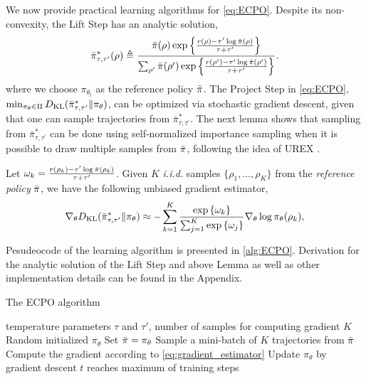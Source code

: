 We now provide practical learning algorithms for \cref{eq:ECPO}.
Despite its non-convexity, the Lift Step
has an analytic solution,
{\small
\begin{equation}
	\label{eq:pitautauprime}
	\bar{\pi}_{\tau,\tau^{\prime}}^*(\rho) \triangleq \frac{\bar{\pi}(\rho) \exp\left\{ \frac{r(\rho)-\tau^{\prime} \log \bar{\pi}(\rho) }{ \tau+\tau^{\prime}} \right\}}{ \sum_{\rho^{\prime}}{\bar{\pi}(\rho^{\prime}) \exp\left\{ \frac{r(\rho^{\prime})-\tau^{\prime} \log \bar{\pi}(\rho^{\prime})}{ \tau+\tau^{\prime}} \right\} } }.
\end{equation}
}	
 where we choose $\pi_{\theta_t}$ as the reference policy $\bar{\pi}$. The Project Step in \cref{eq:ECPO}, $\min\nolimits_{\pi_\theta \in \Pi}{D_{\mathrm{KL}}( \bar{\pi}_{\tau,\tau^{\prime}}^* \| \pi_\theta ) }$, can be optimized via stochastic gradient descent, given that one can sample trajectories from $\bar{\pi}_{\tau,\tau^{\prime}}^*$. %
The next lemma shows that sampling from $\bar{\pi}_{\tau,\tau^{\prime}}^*$ can be done using self-normalized importance sampling \citep{owen2013monte} when it is possible to draw multiple samples from $\bar{\pi}$, following the idea of UREX \citep{nachum2017improving}.   
\begin{lem}
\label{lem:ECPOgradientestimate}
Let $\omega_k = \frac{r(\rho_k) - \tau^{\prime} \log{\bar{\pi}(\rho_k)} }{\tau + \tau^{\prime}}$. Given $K$ \emph{i.i.d.} samples $\{\rho_1, \dots, \rho_K\}$ from the \emph{reference policy} $\bar{\pi}$, we have the following unbiased gradient estimator,
{\small
\begin{equation}
\label{eq:gradient_estimator}
	\nabla_{\theta} D_{\mathrm{KL}}(\bar{\pi}_{\tau,\tau^{\prime}}^* \| \pi_\theta)\approx -\sum\limits_{k=1}^K{ \frac{ \exp\left\{ \omega_k \right\} }{ \sum_{j=1}^K{ \exp\left\{ \omega_j \right\}}} \nabla_{\theta} \log{\pi_\theta(\rho_k)} },
\end{equation}
}
\end{lem}
Pesudeocode of the learning algorithm is presented in \cref{alg:ECPO}. Derivation for the analytic solution of the Lift Step and above Lemma as well as other implementation details can be found in the Appendix.%

\begin{algorithm}[t]
	\caption{\label{alg:ECPO}  The ECPO algorithm}
	\begin{algorithmic}[1]
		\INPUT temperature parameters $\tau$ and $\tau'$, number of samples for computing gradient $K$
		\STATE Random initialized $\pi_{\theta}$
		\STATE Set $\bar{\pi} = \pi_\theta$
		\REPEAT 
		\STATE Sample a mini-batch of $K$ trajectories from $\bar{\pi}$
		\STATE Compute the gradient according to \cref{eq:gradient_estimator}
		\STATE Update $\pi_{\theta}$ by gradient descent
		\UNTIL $t$ reaches maximum of training steps
		\ENDFOR
	\end{algorithmic}
\end{algorithm}


